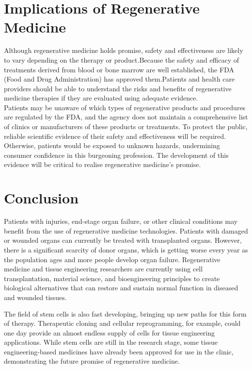\documentclass[12pt]{article}
\begin{document}
\section*{\LARGE Implications of Regenerative Medicine  }
\Large
\raggedright
Although regenerative medicine holds promise, safety and effectiveness are likely to vary depending on the therapy or product.Because the safety and efficacy of treatments derived from blood or bone marrow are well established, the FDA (Food and Drug Administration) has approved them.Patients and health care providers should be able to understand the risks and benefits of regenerative medicine therapies if they are evaluated using adequate evidence.\\
\vspace{3mm}
Patients may be unaware of which types of regenerative products and procedures are regulated by the FDA, and the agency does not maintain a comprehensive list of clinics or manufacturers of these products or treatments.
\vspace{3mm}
To protect the public, reliable scientific evidence of their safety and effectiveness will be required. Otherwise, patients would be exposed to unknown hazards, undermining consumer confidence in this burgeoning profession. The development of this evidence will be critical to realise regenerative medicine's promise.

\newpage



\centering \section*{\Huge Conclusion }
\Large
\raggedright
Patients with injuries, end-stage organ failure, or other clinical conditions may benefit from the use of regenerative medicine technologies. Patients with damaged or wounded organs can currently be treated with transplanted organs. However, there is a significant scarcity of donor organs, which is getting worse every year as the population ages and more people develop organ failure. Regenerative medicine and tissue engineering researchers are currently using cell transplantation, material science, and bioengineering principles to create biological alternatives that can restore and sustain normal function in diseased and wounded tissues.

The field of stem cells is also fast developing, bringing up new paths for this form of therapy. Therapeutic cloning and cellular reprogramming, for example, could one day provide an almost endless supply of cells for tissue engineering applications. While stem cells are still in the research stage, some tissue engineering-based medicines have already been approved for use in the clinic, demonstrating the future promise of regenerative medicine.
\end{document}
